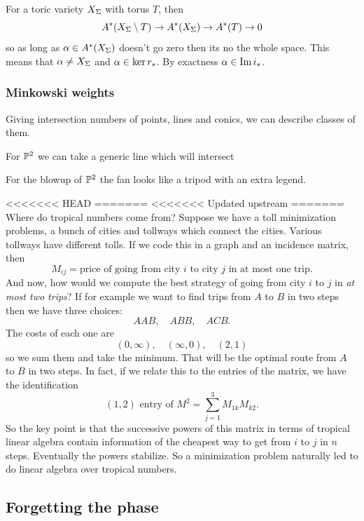\documentclass[12pt]{memoir}
\begin{document}
\begin{Ex}
    For a toric variety $X_\Sigma$ with torus $T$, then 
    $$A^\ast(X_\Sigma\setminus T)\to A^\ast(X_\Sigma)\to A^\ast(T)\to 0$$
    so as long as $\alpha\in A^\ast(X_\Sigma)$ doesn't go zero then its no the whole space. This means that $\alpha\neq X_\Sigma$ and $\alpha\in\ker r_\ast$. By exactness $\alpha\in\Im i_\ast$.
\end{Ex}

\subsubsection{Minkowski weights}

Giving intersection numbers of points, lines and conics, we can describe classes of them. 

\begin{Ex}
    For $\mathbb{P}^2$ we can take a generic line which will intersect 
\end{Ex}

\begin{Ex}
    For the blowup of $\mathbb{P}^2$ the fan looks like a tripod with an extra legend. 
\end{Ex}

<<<<<<< HEAD
=======
<<<<<<< Updated upstream
=======
Where do tropical numbers come from? Suppose we have a toll minimization problems, a bunch of cities and tollways which connect the cities. Various tollways have different tolls. If we code this in a graph and an incidence matrix, then 
$$M_{ij}=\text{price of going from city }i\text{ to city }j\text{ in at most one trip}.$$
And now, how would we compute the best strategy of going from city $i$ to $j$ in \emph{at most two trips}? If for example we want to find trips from $A$ to $B$ in two steps then we have three choices:
$$AAB,\quad ABB,\quad ACB.$$
The costs of each one are 
$$(0,\infty),\quad (\infty,0),\quad (2,1)$$
so we sum them and take the minimum. That will be the optimal route from $A$ to $B$ in two steps. In fact, if we relate this to the entries of the matrix, we have the identification 
$$(1,2)\text{ entry of }M^2=\sum_{j=1}^{3}M_{1k}M_{k2}.$$
So the key point is that the successive powers of this matrix in terms of tropical linear algebra contain information of the cheapest way to get from $i$ to $j$ in $n$ steps. Eventually the powers stabilize. So a minimization problem naturally led to do linear algebra over tropical numbers.

\subsection{Forgetting the phase}
\end{document}
